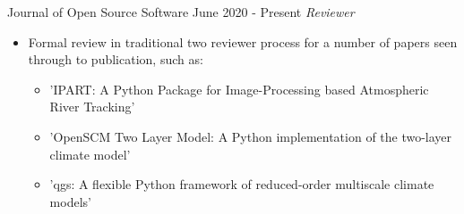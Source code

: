 \begin{projects}

\projecta
	{Journal of Open Source Software \lbrack\href{https://joss.theoj.org/}{\small{\websiteSymbol}}\rbrack}{June 2020 - Present}
	{
	    \textit{Reviewer}
	}
	{\begin{itemize}
     \item Formal review in traditional two reviewer process for a number of papers seen through to publication, such as:
     \begin{itemize}
        \item 'IPART: A Python Package for Image-Processing based Atmospheric River Tracking' \lbrack\href{https://joss.theoj.org/papers/10.21105/joss.02407}{\small{\websiteSymbol}}\rbrack
        \item 'OpenSCM Two Layer Model: A Python implementation of the two-layer climate model'
        \lbrack\href{https://joss.theoj.org/papers/10.21105/joss.02766}{\small{\websiteSymbol}}\rbrack
        \item 'qgs: A flexible Python framework of reduced-order multiscale climate models'
        \lbrack\href{https://joss.theoj.org/papers/10.21105/joss.02597}{\small{\websiteSymbol}}\rbrack
    \end{itemize}
     \end{itemize}}


\end{projects}
\vspace{-3mm}